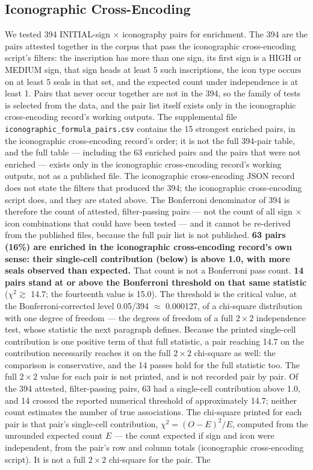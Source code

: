 \documentclass[11pt]{article}
\begin{document}
\subsection{Iconographic Cross-Encoding
}\label{iconographic-cross-encoding-phase-143}

We tested 394 INITIAL-sign $\times$ iconography pairs for enrichment. The 394 are the pairs attested together in the corpus that pass the iconographic cross-encoding script's filters: the inscription has more than one sign, its first sign is a HIGH or MEDIUM sign, that sign heads at least 5 such inscriptions, the icon type occurs on at least 5 seals in that set, and the expected count under independence is at least 1. Pairs that never occur together are not in the 394, so the family of tests is selected from the data, and the pair list itself exists only in the iconographic cross-encoding record's working outputs. The supplemental file \texttt{iconographic\_formula\_pairs.csv} contains the 15 strongest enriched pairs, in the iconographic cross-encoding record's order; it is not the full 394-pair table, and the full table --- including the 63 enriched pairs and the pairs that were not enriched --- exists only in the iconographic cross-encoding record's working outputs, not as a published file. The iconographic cross-encoding JSON record does not state the filters that produced the 394; the iconographic cross-encoding script does, and they are stated above. The Bonferroni denominator of 394 is therefore the count of attested, filter-passing pairs --- not the count of all sign $\times$ icon combinations that could have been tested --- and it cannot be re-derived from the published files, because the full pair list is not published. \textbf{63 pairs (16\%) are enriched in the iconographic cross-encoding record's own sense: their single-cell contribution (below) is above 1.0, with more seals observed than expected.} That count is not a Bonferroni pass count. \textbf{14 pairs stand at or above the Bonferroni threshold on that same statistic} ($\chi^2 \gtrsim$ 14.7; the fourteenth value is 15.0). The threshold is the critical value, at the Bonferroni-corrected level 0.05/394 $\approx$ 0.000127, of a chi-square distribution with one degree of freedom --- the degrees of freedom of a full $2\times2$ independence test, whose statistic the next paragraph defines. Because the printed single-cell contribution is one positive term of that full statistic, a pair reaching 14.7 on the contribution necessarily reaches it on the full $2\times2$ chi-square as well: the comparison is conservative, and the 14 passes hold for the full statistic too. The full $2\times2$ value for each pair is not printed, and is not recorded pair by pair. Of the 394 attested, filter-passing pairs, 63 had a single-cell contribution above 1.0, and 14 crossed the reported numerical threshold of approximately 14.7; neither count estimates the number of true associations. The chi-square printed for each pair is that pair's single-cell contribution, $\chi^2 = (O - E)^2 / E$, computed from the unrounded expected count $E$ --- the count expected if sign and icon were independent, from the pair's row and column totals (iconographic cross-encoding script). It is not a full $2\times2$ chi-square for the pair. The 
\end{document}
